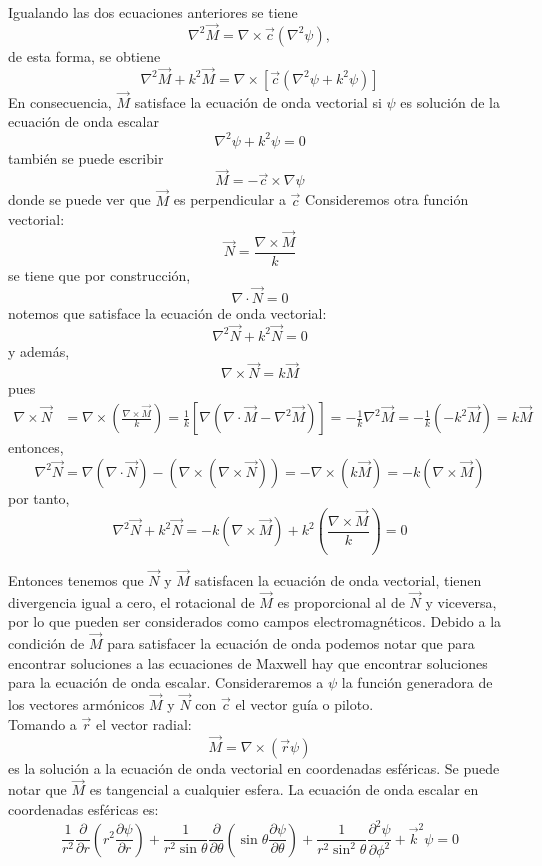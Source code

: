 Igualando las dos ecuaciones anteriores se tiene
\begin{equation*}   
	\nabla^2\Vec{M}=\nabla\times\Vec{c}(\nabla^2\psi),
\end{equation*}
de esta forma, se obtiene 
\begin{equation*}   
	\nabla^2\Vec{M}+k^2\Vec{M}=\nabla\times[\Vec{c}(\nabla^2\psi+k^2\psi)]
\end{equation*} 
En consecuencia, $\Vec{M}$ satisface la ecuación de onda vectorial si $\psi$ es solución de la ecuación de onda escalar
\begin{equation*}   
	\nabla^2\psi+k^2\psi=0
\end{equation*}
también se puede escribir
$$\Vec{M}=-\Vec{c}\times\nabla\psi$$
donde se puede ver que $\Vec{M}$ es perpendicular a $\Vec{c}$ 
Consideremos otra función vectorial:
$$\Vec{N}=\frac{\nabla\times\Vec{M}}{k}$$
se tiene que por construcción,
$$\nabla\cdot\Vec{N}=0$$
notemos que satisface la ecuación de onda vectorial:
$$\nabla^2\Vec{N}+k^2\Vec{N}=0$$
y además, 
$$\nabla\times\Vec{N}=k\Vec{M}$$
pues 
\begin{align*}
    \nabla\times\Vec{N}&=\nabla\times\left(\frac{\nabla\times\Vec{M}}{k}\right)=\frac{1}{k}[\nabla(\nabla\cdot\Vec{M}-\nabla^2\Vec{M})]=-\frac{1}{k}\nabla^2\Vec{M}=-\frac{1}{k}(-k^2\Vec{M})=k\Vec{M}
\end{align*}
entonces, 
$$\nabla^2\Vec{N}=\nabla(\nabla\cdot\Vec{N})-(\nabla\times(\nabla\times\Vec{N}))=-\nabla\times(k\Vec{M})=-k(\nabla\times\Vec{M})$$
por tanto, 
$$\nabla^2\Vec{N}+k^2\Vec{N}=-k(\nabla\times\Vec{M})+k^2\left(\frac{\nabla\times\Vec{M}}{k}\right)=0$$

Entonces tenemos que $\Vec{N}$ y $\Vec{M}$ satisfacen la ecuación de onda vectorial, tienen divergencia igual a cero, el rotacional de $\Vec{M}$ es proporcional al de $\Vec{N}$ y viceversa, por lo que pueden ser considerados como campos electromagnéticos. Debido a la condición de $\Vec{M}$ para satisfacer la ecuación de onda podemos notar que para encontrar soluciones a las ecuaciones de Maxwell hay que encontrar soluciones para la ecuación de onda escalar. Consideraremos a $\psi$ la función generadora de los vectores armónicos $\Vec{M}$ y $\Vec{N}$ con $\Vec{c}$ el vector guía o piloto.\\

Tomando a $\Vec{r}$ el vector radial:
$$\Vec{M}=\nabla\times(\Vec{r}\psi)$$
es la solución a la ecuación de onda vectorial en coordenadas esféricas. Se puede notar que $\Vec{M}$ es tangencial a cualquier esfera. La ecuación de onda escalar en coordenadas esféricas es:
$$\frac{1}{r^2}\frac{\partial}{\partial r}\left(r^2\frac{\partial\psi}{\partial r}\right)+\frac{1}{r^2\sin\theta}\frac{\partial}{\partial\theta}\left(\sin\theta\frac{\partial\psi}{\partial\theta}\right)+\frac{1}{r^2\sin^2\theta}\frac{\partial^2\psi}{\partial\phi^2}+\Vec{k}^2\psi=0$$

